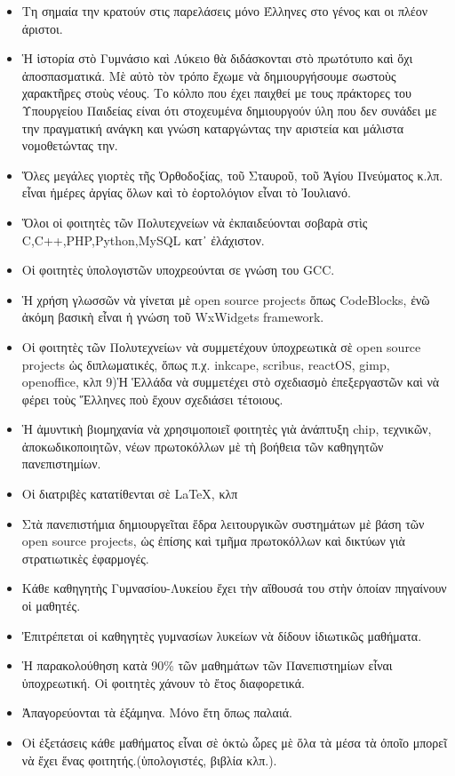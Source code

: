 \documentclass[a4paper]{article}
\begin{document}
\begin{itemize}
\item Τη σημαία την κρατούν στις παρελάσεις μόνο Έλληνες στο γένος και οι πλέον άριστοι.
\item Ἡ ἱστορία στὸ Γυμνάσιο καὶ Λύκειο θὰ διδάσκονται στὸ πρωτότυπο καὶ ὄχι ἀποσπασματικά. Μὲ αὐτὸ τὸν τρόπο ἔχωμε νὰ δημιουργήσουμε σωστοὺς χαρακτῆρες στοὺς νέους. Το κόλπο που έχει παιχθεί με τους πράκτορες του Υπουργείου Παιδείας είναι ότι στοχευμένα δημιουργούν ύλη που δεν συνάδει με την πραγματική ανάγκη και γνώση καταργώντας την αριστεία και μάλιστα νομοθετώντας την.
\item Ὅλες μεγάλες γιορτὲς τῆς Ὀρθοδοξίας, τοῦ Σταυροῦ, τοῦ Ἁγίου Πνεύματος κ.λπ. εἶναι ἡμέρες ἀργίας ὅλων καὶ τὸ ἐορτολόγιον εἶναι τὸ Ἰουλιανό.
\item Ὅλοι οἱ φοιτητὲς τῶν Πολυτεχνείων νὰ ἐκπαιδεύονται σοβαρὰ στὶς C,C++,PHP,Python,MySQL κατ᾿ ἐλάχιστον.
\item Οἱ φοιτητὲς ὑπολογιστῶν υποχρεούνται σε γνώση του GCC.
\item Ἡ χρήση γλωσσῶν νὰ γίνεται μὲ open source projects ὅπως CodeBlocks, ἐνῶ ἀκόμη βασικὴ εἶναι ἡ γνώση τοῦ WxWidgets framework.
\item Οἱ φοιτητὲς τῶν Πολυτεχνείωv νὰ συμμετέχουν ὑποχρεωτικὰ σὲ open source projects ὡς διπλωματικές, ὅπως π.χ. inkcape, scribus, reactOS, gimp, openoffice, κλπ 9)Ἡ Ἑλλάδα νὰ συμμετέχει στὸ σχεδιασμὸ ἐπεξεργαστῶν καὶ νὰ φέρει τοὺς Ἕλληνες ποὺ ἔχουν σχεδιάσει τέτοιους.
\item Ἡ ἀμυντικὴ βιομηχανία νὰ χρησιμοποιεῖ φοιτητὲς γιὰ ἀνάπτυξη chip, τεχνικῶν, ἀποκωδικοποιητῶν, νέων πρωτοκόλλων μὲ τὴ βοήθεια τῶν καθηγητῶν πανεπιστημίων.
\item Οἱ διατριβὲς κατατίθενται σὲ \LaTeX, \XeLaTeX κλπ 
\item Στὰ πανεπιστήμια δημιουργεῖται ἕδρα λειτουργικῶν συστημάτων μὲ βάση τῶν open source projects, ὡς ἐπίσης καὶ τμῆμα πρωτοκόλλων καὶ δικτύων γιὰ στρατιωτικὲς ἐφαρμογές.
\item Κάθε καθηγητὴς Γυμνασίου-Λυκείου ἔχει τὴν αἴθουσά του στὴν ὁποίαν πηγαίνουν οἱ μαθητές.
\item Ἐπιτρέπεται οἱ καθηγητὲς γυμνασίων λυκείων νὰ δίδουν ἰδιωτικῶς μαθήματα.
\item Ἡ παρακολούθηση κατὰ 90\% τῶν μαθημάτων τῶν Πανεπιστημίων εἶναι ὑποχρεωτική. Οἱ φοιτητὲς χάνουν τὸ ἔτος διαφορετικά.
\item Ἀπαγορεύονται τὰ ἑξάμηνα. Μόνο ἔτη ὅπως παλαιά.
\item Οἱ ἐξετάσεις κάθε μαθήματος εἶναι σὲ ὀκτὼ ὧρες μὲ ὅλα τὰ μέσα τὰ ὁποῖο μπορεῖ νὰ ἔχει ἕνας φοιτητής.(ὑπολογιστές, βιβλία κλπ.).

\end{itemize}
\end{document}
